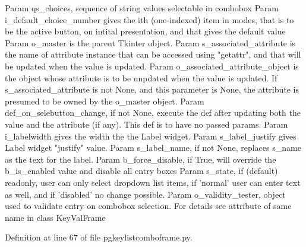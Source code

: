 \begin{DoxyVerb}Param qs_choices, sequence of string values selectable in combobox
Param i_default_choice_number gives the ith (one-indexed)
    item in modes, that is to be the active button,
    on intital presentation, and that gives the default value
Param o_master is the parent Tkinter object.
Param s_associated_attribute is the name of 
    attribute instance that can be accessed
    using "getattr", and that will be
    updated when the value is updated.
Param o_associated_attribute_object is the object whose attribute
    is to be unpdated when the value is updated.  If
    s_associated_attribute is not None, and this parameter
    is None, the attribute is presumed to be
    owned by the o_master object.
Param def_on_selebutton_change, if not None, execute the def
    after updating both the value and the attribute (if any).
    This def is to have no passed params.
Param i_labelwidth gives the width the the Label widget.
Param s_label_justify gives Label widget "justify" value.
Param s_label_name, if not None, replaces s_name as the text for the label.
Param b_force_disable, if True, will override the b_is_enabled value and disable all entry 
      boxes
Param s_state, if (default) readonly, user can only select dropdown list items, if 'normal'
      user can enter text as well, and if 'disabled' no change possible.
Param o_validity_tester, object used to validate entry on combobox selection.  For details
     see attribute of same name in class KeyValFrame
\end{DoxyVerb}
 

Definition at line 67 of file pgkeylistcomboframe.\+py.


